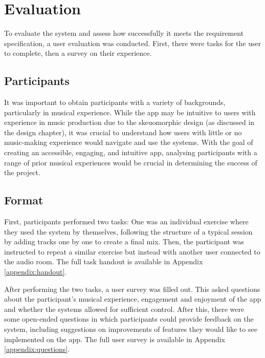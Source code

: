 \chapter{Evaluation} 

To evaluate the system and assess how successfully it meets the requirement specification, a user evaluation was conducted. First, there were tasks for the user to complete, then a survey on their experience.

\section{Participants}
It was important to obtain participants with a variety of backgrounds, particularly in musical experience. While the app may be intuitive to users with experience in music production due to the skeuomorphic design (as discussed in the design chapter), it was crucial to understand how users with little or no music-making experience would navigate and use the systems. With the goal of creating an accessible, engaging, and intuitive app, analysing participants with a range of prior musical experiences would be crucial in determining the success of the project.

\section{Format}
First, participants performed two tasks: One was an individual exercise where they used the system by themselves, following the structure of a typical session by adding tracks one by one to create a final mix. Then, the participant was instructed to repeat a similar exercise but instead with another user connected to the audio room. The full task handout is available in Appendix \ref{appendix:handout}.

After performing the two tasks, a user survey was filled out. This asked questions about the participant’s musical experience, engagement and enjoyment of the app and whether the systems allowed for sufficient control. After this, there were some open-ended questions in which participants could provide feedback on the system, including suggestions on improvements of features they would like to see implemented on the app. The full user survey is available in Appendix \ref{appendix:questions}.


